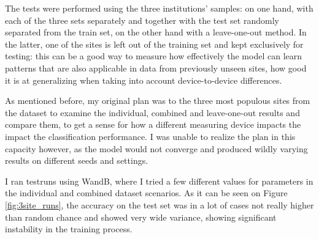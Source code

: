 	The tests were performed using the three institutions' samples: on one hand, with each of the three sets separately and together with the test set randomly separated from the train set, on the other hand with a leave-one-out method. In the latter, one of the sites is left out of the training set and kept exclusively for testing: this can be a good way to measure how effectively the model can learn patterns that are also applicable in data from previously unseen sites, how good it is at generalizing when taking into account device-to-device differences.
	
	As mentioned before, my original plan was to the three most populous sites from the dataset to examine the individual, combined and leave-one-out results and compare them, to get a sense for how a different measuring device impacts the impact the classification performance. I was unable to realize the plan in this capacity however, as the model would not converge and produced wildly varying results on different seeds and settings. 
	
	I ran testruns using WandB, where I tried a few different values for parameters in the individual and combined dataset scenarios. As it can be seen on Figure \ref{fig:3site_runs}, the accuracy on the test set was in a lot of cases not really higher than random chance and showed very wide variance, showing significant instability in the training process.
	

